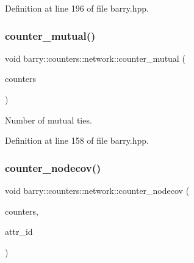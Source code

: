 Definition at line 196 of file barry.\+hpp.

\mbox{\label{namespacebarry_1_1counters_1_1network_a668c4f3b6abba62e113ae7e382d4b63a}} 
\subsubsection{\texorpdfstring{counter\+\_\+mutual()}{counter\_mutual()}}
{\footnotesize\ttfamily void barry\+::counters\+::network\+::counter\+\_\+mutual (\begin{DoxyParamCaption}\item[{\hyperlink{namespacebarry_1_1counters_1_1network_aa72fdb34752ac24167a06ee196a8fff6}{Net\+Counters} $\ast$}]{counters }\end{DoxyParamCaption})\hspace{0.3cm}{\ttfamily [inline]}}



Number of mutual ties. 



Definition at line 158 of file barry.\+hpp.

\mbox{\label{namespacebarry_1_1counters_1_1network_a0f18e2af090591c3f47c95849ec324da}} 
\subsubsection{\texorpdfstring{counter\+\_\+nodecov()}{counter\_nodecov()}}
{\footnotesize\ttfamily void barry\+::counters\+::network\+::counter\+\_\+nodecov (\begin{DoxyParamCaption}\item[{\hyperlink{namespacebarry_1_1counters_1_1network_aa72fdb34752ac24167a06ee196a8fff6}{Net\+Counters} $\ast$}]{counters,  }\item[{\hyperlink{namespacebarry_a11dfc53ddb4672278319aa04f1e09a6c}{uint}}]{attr\+\_\+id }\end{DoxyParamCaption})\hspace{0.3cm}{\ttfamily [inline]}}



